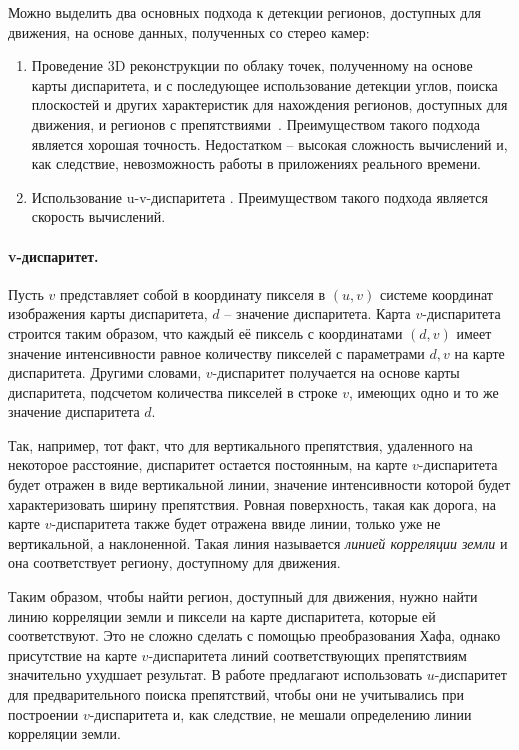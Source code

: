 \documentclass[oneside,final,12pt]{scrartcl}
\begin{document}
	 		Можно выделить два основных подхода к детекции регионов, доступных для движения, на основе данных, полученных со стерео камер:
		 	\begin{enumerate}
		 		\item Проведение 3D реконструкции по облаку точек, полученному на основе карты диспаритета, и с последующее использование детекции углов, поиска плоскостей и других характеристик для нахождения регионов, доступных для движения, и регионов с препятствиями~\cite{Li2007, Murarka2008, Braun2008}. Преимуществом такого подхода является хорошая точность. Недостатком -- высокая сложность вычислений и, как следствие, невозможность работы в приложениях реального времени.

		 		\item Использование u-v-диспаритета \cite{Labayrade2002, Broggi2005, Hu2005}. Преимуществом такого подхода является скорость вычислений.
		 	\end{enumerate}

	 		\paragraph{v-диспаритет.}  Пусть \(v\) представляет собой в координату пикселя в \(\left(u,v\right)\) системе координат изображения карты диспаритета, \(d\) -- значение диспаритета. Карта \(v\)-диспаритета строится таким образом, что каждый её пиксель с координатами \(\left(d,v\right)\) имеет значение интенсивности равное количеству пикселей с параметрами \(d,v\) на карте диспаритета. Другими словами, \(v\)-диспаритет получается на основе карты диспаритета, подсчетом  количества пикселей в строке \(v\), имеющих одно и то же значение диспаритета \(d\).

	 		Так, например, тот факт, что для вертикального препятствия, удаленного на некоторое расстояние, диспаритет остается постоянным, на карте \(v\)-диспаритета будет отражен в виде вертикальной линии, значение интенсивности которой будет характеризовать ширину препятствия.
	 		Ровная поверхность, такая как дорога, на карте \(v\)-диспаритета также будет отражена ввиде линии, только уже не вертикальной, а наклоненной. Такая линия называется \textit{линией корреляции земли} и она соответствует региону, доступному для движения.

	 		Таким образом, чтобы найти регион, доступный для движения, нужно найти линию корреляции земли и пиксели на карте диспаритета, которые ей соответствуют. Это не сложно сделать с помощью преобразования Хафа, однако присутствие на карте \(v\)-диспаритета линий соответствующих препятствиям значительно ухудшает результат. В работе \cite{Zhu2013} предлагают использовать \(u\)-диспаритет для предварительного поиска препятствий, чтобы они не учитывались при построении \(v\)-диспаритета и, как следствие, не мешали определению линии корреляции земли.
\end{document}
